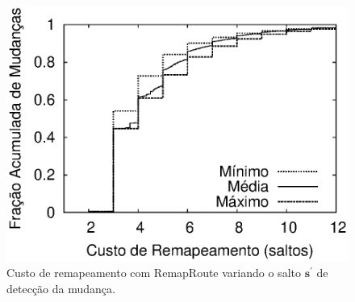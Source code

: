 \documentclass{JBCS}
\newcommand{\rmprt}{{Re\-map\-Rou\-te}}
\begin{document}
\begin{figure}[t]
\begin{center}
\includegraphics[width=0.96\columnwidth]{figs/rmprtcost.eps}
\caption{Custo de remapeamento com \rmprt{} variando o salto
$\boldsymbol{s^\prime}$ de detecção da mudança.}
\label{fig:sim.rmprt.start}
\end{center}
\end{figure}
\end{document}
